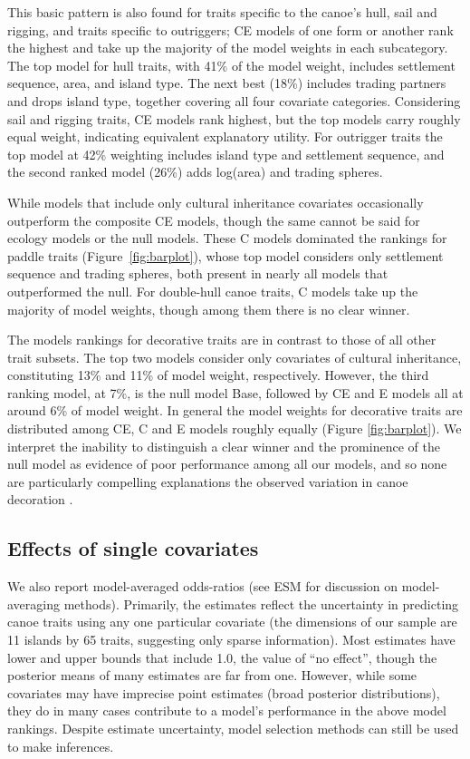 \documentclass[11pt]{article}
\begin{document}
This basic pattern is also found for traits specific to the canoe's hull, sail and rigging, and traits specific to outriggers; CE models of one form or another rank the highest and take up the majority of the model weights in each subcategory. The top model for hull traits, with 41\% of the model weight, includes settlement sequence, area, and island type. The next best (18\%) includes trading partners and drops island type, together covering all four covariate categories. Considering sail and rigging traits, CE models rank highest, but the top models carry roughly equal weight, indicating equivalent explanatory utility. For outrigger traits the top model at 42\% weighting includes island type and settlement sequence, and the second ranked model (26\%) adds log(area) and trading spheres. 

While models that include only cultural inheritance covariates occasionally outperform the composite CE models, though the same cannot be said for ecology models or the null models. These C models dominated the rankings for paddle traits (Figure~\ref{fig:barplot}), whose top model considers only settlement sequence and trading spheres, both present in nearly all models that outperformed the null. For double-hull canoe traits, C models take up the majority of model weights, though among them there is no clear winner. 

The models rankings for decorative traits are in contrast to those of all other trait subsets. The top two models consider only covariates of cultural inheritance, constituting 13\% and 11\% of model weight, respectively. However, the third ranking model, at 7\%, is the null model Base, followed by CE and E models all at around 6\% of model weight. In general the model weights for decorative traits are distributed among CE, C and E models roughly equally (Figure \ref{fig:barplot}). We interpret the inability to distinguish a clear winner and the prominence of the null model as evidence of poor performance among all our models, and so none are particularly compelling explanations the observed variation in canoe decoration \citep{Burnham&Anderson:2002}. 


\subsection{Effects of single covariates}

We also report model-averaged odds-ratios (see ESM for discussion on model-averaging methods). Primarily, the estimates reflect the uncertainty in predicting canoe traits using any one particular covariate (the dimensions of our sample are 11 islands by 65 traits, suggesting only sparse information). Most estimates have lower and upper bounds that include 1.0, the value of ``no effect'', though the posterior means of many estimates are far from one. However, while some covariates may have imprecise point estimates (broad posterior distributions), they do in many cases contribute to a model's performance in the above model rankings. Despite estimate uncertainty, model selection methods can still be used to make inferences. 
\end{document}
